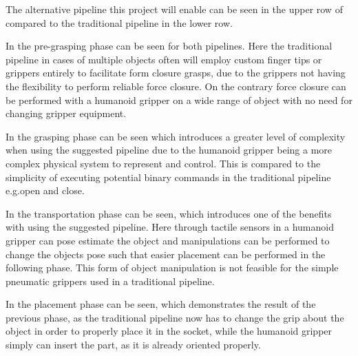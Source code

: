 The alternative pipeline this project will enable can be seen in the upper row of  compared to the traditional pipeline in the lower row.\medskip 

In  the pre-grasping phase can be seen for both pipelines. Here the traditional pipeline in cases of multiple objects often will employ custom finger tips or grippers entirely to facilitate form closure grasps, due to the grippers not having the flexibility to perform reliable force closure. On the contrary force closure can be performed with a humanoid gripper on a wide range of object with no need for changing gripper equipment. \medskip

In  the grasping phase can be seen which introduces a greater level of complexity when using the suggested pipeline due to the humanoid gripper being a more complex physical system to represent and control. This is compared to the simplicity of executing potential binary commands in the traditional pipeline e.g.open and close. \medskip

In  the transportation phase can be seen, which introduces one of the benefits with using the suggested pipeline. Here through tactile sensors in a humanoid gripper can pose estimate the object and manipulations can be performed to change the objects pose such that easier placement can be performed in the following phase. This form of object manipulation is not feasible for the simple pneumatic grippers used in a traditional pipeline. \medskip

In  the placement phase can be seen, which demonstrates the result of the previous phase, as the traditional pipeline now has to change the grip about the object in order to properly place it in the socket, while the humanoid gripper simply can insert the part, as it is already oriented properly. \medskip

\newpage

